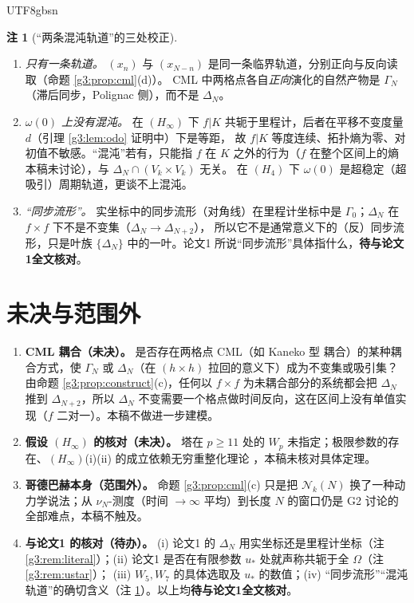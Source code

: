 \documentclass[11pt,a4paper]{article}
\newcommand{\Cnt}{\mathcal N}          %
\newcommand{\Om}{\Omega}               %
\newcommand{\ust}{u_{*}}
\theoremstyle{plain}
\theoremstyle{definition}
\newtheorem{rem}[lem]{注}
\begin{document}
\begin{CJK}{UTF8}{gbsn}
\begin{rem}[“两条混沌轨道”的三处校正]\label{g3:rem:entropy}
\begin{enumerate}[leftmargin=*,label=(\arabic*)]
\item \emph{只有一条轨道。} $(x_n)$ 与 $(x_{N-n})$ 是同一条临界轨道，分别正向与反向读取（命题 \ref{g3:prop:cml}(d)）。
CML 中两格点各自\emph{正向}演化的自然产物是 $\Gamma_N$（滞后同步，Polignac 侧），而不是 $\Delta_N$。
\item \emph{$\omega(0)$ 上没有混沌。} 在 $(H_\infty)$ 下 $f|K$ 共轭于里程计，后者在平移不变度量 $d$（引理 \ref{g3:lem:odo} 证明中）下是等距，
故 $f|K$ 等度连续、拓扑熵为零、对初值不敏感。“混沌”若有，只能指 $f$ 在 $K$ 之外的行为（$f$ 在整个区间上的熵本稿未讨论），与 $\Delta_N\cap(V_k\times V_k)$ 无关。
在 $(H_4)$ 下 $\omega(0)$ 是超稳定（超吸引）周期轨道，更谈不上混沌。
\item \emph{“同步流形”。} 实坐标中的同步流形（对角线）在里程计坐标中是 $\Gamma_0$；$\Delta_N$ 在 $f\times f$ 下不是不变集（$\Delta_N\to\Delta_{N+2}$），
所以它不是通常意义下的（反）同步流形，只是叶族 $\{\Delta_N\}$ 中的一叶。论文1 所说“同步流形”具体指什么，\textbf{待与论文1全文核对}。
\end{enumerate}
\end{rem}

\section{未决与范围外}\label{g3:sec:open}
\begin{enumerate}[leftmargin=*]
\item \textbf{CML 耦合（未决）。} 是否存在两格点 CML（如 Kaneko 型 \cite{Kan84} 耦合）的某种耦合方式，使 $\Gamma_N$ 或 $\Delta_N$（在 $(h\times h)$ 拉回的意义下）成为不变集或吸引集？
由命题 \ref{g3:prop:construct}(c)，任何以 $f\times f$ 为未耦合部分的系统都会把 $\Delta_N$ 推到 $\Delta_{N+2}$，所以 $\Delta_N$ 不变需要一个格点做时间反向，这在区间上没有单值实现（$f$ 二对一）。本稿不做进一步建模。
\item \textbf{假设 $(H_\infty)$ 的核对（未决）。} 塔在 $p\ge11$ 处的 $W_p$ 未指定；极限参数的存在、$(H_\infty)$(i)(ii) 的成立依赖无穷重整化理论 \cite{dMvS93}，本稿未核对具体定理。
\item \textbf{哥德巴赫本身（范围外）。} 命题 \ref{g3:prop:cml}(c) 只是把 $\Cnt_k(N)$ 换了一种动力学说法；从 $\nu_N$-测度（时间 $\to\infty$ 平均）到长度 $N$ 的窗口仍是 G2 讨论的全部难点，本稿不触及。
\item \textbf{与论文1 的核对（待办）。} (i) 论文1 的 $\Delta_N$ 用实坐标还是里程计坐标（注 \ref{g3:rem:literal}）；(ii) 论文1 是否在有限参数 $\ust$ 处就声称共轭于全 $\Om$（注 \ref{g3:rem:ustar}）；
(iii) $W_5,W_7$ 的具体选取及 $\ust$ 的数值；(iv) “同步流形”“混沌轨道”的确切含义（注 \ref{g3:rem:entropy}）。以上均\textbf{待与论文1全文核对}。
\end{enumerate}


\end{CJK}
\end{document}
